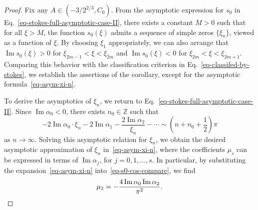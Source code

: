 \documentclass[12pt]{article}
\theoremstyle{plain}
\theoremstyle{definition}
\numberwithin{equation}{section}
\renewcommand\Im{\operatorname{Im}}
\begin{document}
\begin{proof}
Fix any \( A \in (-3/2^{2/3}, C_{0}) \). From the asymptotic expression for \( s_{0} \) in Eq.~\eqref{eq-stokes-full-asymptotic-case-II}, there exists a constant \( M > 0 \) such that for all \( \xi > M \), the function \( s_{0}(\xi) \) admits a sequence of simple zeros \( \{ \xi_n \} \), viewed as a function of \( \xi \). By choosing \( \xi_1 \) appropriately, we can also arrange that \( \Im s_{0}(\xi) > 0 \) for \( \xi_{2m-1} < \xi < \xi_{2m} \) and \( \Im s_{0}(\xi) < 0 \) for \( \xi_{2m} < \xi < \xi_{2m+1} \). Comparing this behavior with the classification criterion in Eq.~\eqref{eq-classifed-by-stokes}, we establish the assertions of the corollary, except for the asymptotic formula~\eqref{eq-asym-xi-n}.


To derive the asymptotics of \( \xi_n \), we return to Eq.~\eqref{eq-stokes-full-asymptotic-case-II}. Since \( \Im \alpha_{0} < 0 \), there exists \( n_{0} \in \mathbb{Z} \) such that
\begin{equation}\label{eq-s0-cos-compare}
-2\Im \alpha_{0}\cdot\xi_{n}-2\Im \alpha_{1}-\frac{2\Im \alpha_{2}}{\xi_{n}}-\cdots\sim \left(n+n_{0}+\frac{1}{2}\right)\pi
\end{equation}
as \( n \to \infty \). Solving this asymptotic relation for \( \xi_n \), we obtain
the desired asymptotic approximation of $\xi_n$ in~\eqref{eq-asym-xi-n},
where the coefficients \( \mu_s \) can be expressed in terms of \( \Im \alpha_{j} \), for \( j = 0, 1, \ldots, s \). In particular, by substituting the expansion~\eqref{eq-asym-xi-n} into~\eqref{eq-s0-cos-compare}, we find
\[
\mu_{2}=-\frac{4\Im\alpha_{0}\Im\alpha_{2}}{\pi^2}. \qedhere
\]
\end{proof}
\end{document}

